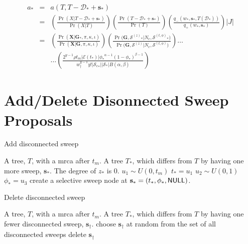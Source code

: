 \documentclass[letterpaper]{article}
\newcommand{\sweep}[1]{{\ensuremath{\mathbf{s}_{#1}}}}
\newcommand{\sweeptime}[1]{{\ensuremath{t_{#1}}}}
\newcommand{\sweepfreq}[1]{{\ensuremath{\phi_{#1}}}}
\newcommand{\sweeploc}[1]{{\ensuremath{z_{#1}}}}
\newcommand{\genealogy}{{\ensuremath{\mathbf{G}}}}
\newcommand{\sequences}{{\ensuremath{\mathbf{X}}}}
\newcommand{\popsize}{{\ensuremath{N_e}}}
\newcommand{\ratesweep}{{\ensuremath{\rho}}}
\newcommand{\sweepalpha}{{\ensuremath{\alpha}}}
\newcommand{\sweepbeta}{{\ensuremath{\beta}}}
\newcommand{\basefreqs}{{\ensuremath{\pi}}}
\newcommand{\pinvar}{{\ensuremath{\iota}}}
\newcommand{\mutmodel}{{\ensuremath{\basefreqs,\kappa,\pinvar}}}
\newcommand{\edgesAt}{{\ensuremath{\mathcal{E}}}}
\newcommand{\entireSweepSet}{{\ensuremath{\mathcal{S}}}}
\newcommand{\connectedSweepSet}{{\ensuremath{\mathcal{S}_c}}}
\newcommand{\sweepsetLocs}{{\ensuremath{\entireSweepSet^{(z)}}}}
\newcommand{\sweepsetTFs}{{\ensuremath{\entireSweepSet^{(t,\phi)}}}}
\newcommand{\NULL}{{\ensuremath{\mbox{{\bf \sf NULL}}}}}
\begin{document}
\begin{eqnarray}
	a_{*} & = & a(T,T-\mathcal{D}_* + \sweep{*}) \nonumber \\
	 & = & \left(\frac{\Pr(X|T-\mathcal{D}_* + \sweep{*})}{\Pr(X|T)}\right)\left(\frac{\Pr(T-\mathcal{D}_* + \sweep{*})}{\Pr(T)}\right)\left(\frac{q_{-}(w_{*},\sweep{*}, T(\mathcal{D}_{*}))}{q_{+}(w_{*},\sweep{*})}\right) |J| \nonumber \\
	 & = & \left(\frac{\Pr(\sequences| \genealogy_{*},\mutmodel)}{\Pr(\sequences| \genealogy,\mutmodel)}\right)\left(\frac{\Pr\Big(\genealogy, \sweepsetLocs_{*} \Big| \popsize, \sweepsetTFs_{*} \Big)}{\Pr\Big(\genealogy, \sweepsetLocs \Big| \popsize, \sweepsetTFs \Big)}\right) \ldots \nonumber \\
	 && \ldots\left(\frac{2^{y-1} \ratesweep t_m |\edgesAt(\sweeptime{*})| \sweepfreq{*}^{\sweepalpha-1}\left(1-\sweepfreq{*}\right)^{\sweepbeta-1}}{w_{\dag}^{y-1}y!| \connectedSweepSet_* ||\entireSweepSet_{*}|B(\sweepalpha, \sweepbeta)}\right) 
	 \frac{}{}
\end{eqnarray}

\section{Add/Delete Disonnected Sweep Proposals}

\begin{algorithm} 
\caption{Add disconnected sweep}
\label{ads}
\begin{algorithmic}[1]
	\REQUIRE A tree, $T$, with a mrca after $t_m$.
	\ENSURE A tree $T_{*}$, which differs from $T$ by having one more sweep, $\sweep{*}$. The degree of $\sweeploc{*}$ is 0.
	\STATE $u_1 \sim U(0, t_m)$
	\STATE $\sweeptime{*} = u_1$
	\STATE $u_2 \sim U(0,1)$
	\STATE $\sweepfreq{*} = u_3$
	\STATE create a selective sweep node at $\sweep{*} =(\sweeptime{*},\sweepfreq{*}, \NULL)$.
\end{algorithmic}
\end{algorithm} 
\begin{algorithm} 
\caption{Delete disconnected sweep}
\label{dds}
\begin{algorithmic}[1]
	\REQUIRE A tree, $T$, with a mrca after $t_m$.
	\ENSURE A tree $T_{*}$, which differs from $T$ by having one fewer disconnected sweep, $\sweep{\dag}$.
	\ENDIF
	\STATE choose $\sweep{\dag}$ at random from the set of all disconnected sweeps
	\STATE delete $\sweep{\dag}$
\end{algorithmic}
\end{algorithm} 
\end{document}
